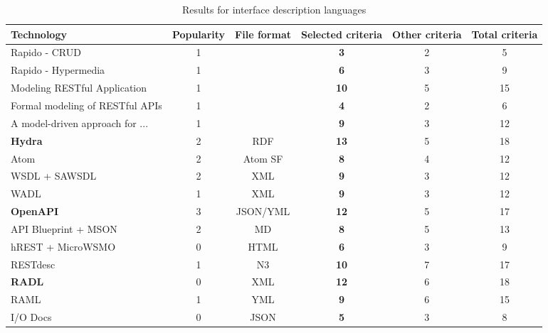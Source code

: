 \begin{table*}[h]
\begin{minipage}[t]{0.5\linewidth}
\begin{tabular}{|l|c|c|c|c|c|}
 \hline
 \textbf{Technology} & \textbf{Popularity} & \textbf{File format} & \textbf{Selected criteria} & \textbf{Other criteria} & \textbf{Total criteria} \\
 \hline
 Rapido - CRUD & 1 & \cellcolor{black} & \textbf{3} & 2 & 5 \\
 Rapido - Hypermedia & 1 & \cellcolor{black} & \textbf{6} & 3 & 9 \\
 Modeling RESTful Application & 1 & \cellcolor{black} & \textbf{10} & 5 & 15 \\
 Formal modeling of RESTful APIs & 1 & \cellcolor{black} & \textbf{4} & 2 & 6 \\
 A model-driven approach for ... & 1 & \cellcolor{black} & \textbf{9} & 3 & 12 \\
 \rowcolor{lightGreen} \textbf{Hydra} & 2 & RDF & \textbf{13} & 5 & 18 \\
 Atom & 2 & Atom SF & \textbf{8} & 4 & 12 \\
 WSDL + SAWSDL & 2 & XML & \textbf{9} & 3 & 12 \\
 WADL & 1 & XML & \textbf{9} & 3 & 12 \\
 \rowcolor{lightGreen} \textbf{OpenAPI} & 3 & JSON/YML & \textbf{12} & 5 & 17 \\
 API Blueprint + MSON & 2 & MD & \textbf{8} & 5 & 13 \\
 hREST + MicroWSMO & 0 & HTML & \textbf{6} & 3 & 9 \\
 RESTdesc & 1 & N3 & \textbf{10} & 7 & 17 \\
 \rowcolor{lightGreen} \textbf{RADL} & 0 & XML & \textbf{12} & 6 & 18 \\
 RAML & 1 & YML & \textbf{9} & 6 & 15 \\
 I/O Docs & 0 & JSON & \textbf{5} & 3 & 8 \\
 \hline
\end{tabular}
\caption{Results for interface description languages}
\label{example-idl-results}
\end{minipage}
\end{table*}